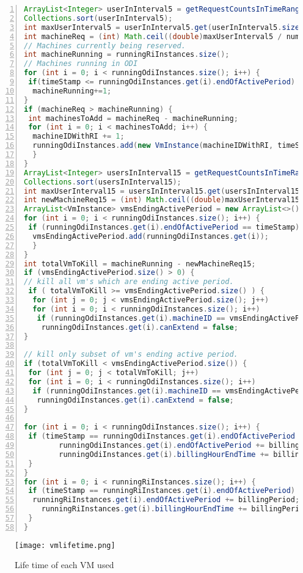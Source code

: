 \begin{lstlisting}[language=java,caption=AppElastic with RI and ODI instances,label=list:appelasticriodi,numbers=left,frame=single,fontadjust=true,breaklines,basicstyle=\small]
ArrayList<Integer> userInInterval5 = getRequestCountsInTimeRange(timeStamp, timeStamp + timeTakenToActive,false);
Collections.sort(userInInterval5);
int maxUserInterval5 = userInInterval5.get(userInInterval5.size() - 1);
int machineReq = (int) Math.ceil((double)maxUserInterval5 / numberOfUserPerInstance);
// Machines currently being reserved.
int machineRunning = runningRiInstances.size();
// Machines running in ODI
for (int i = 0; i < runningOdiInstances.size(); i++) {
 if(timeStamp <= runningOdiInstances.get(i).endOfActivePeriod)
  machineRunning+=1;
}
if (machineReq > machineRunning) {
 int machinesToAdd = machineReq - machineRunning;
 for (int i = 0; i < machinesToAdd; i++) {
  machineIDWithRI += 1;
  runningOdiInstances.add(new VmInstance(machineIDWithRI, timeStamp, timeStamp + billingPeriod, timeStamp + timeTakenToActive, (timeStamp + billingPeriod) - timetakenToShutdown));
  }
}
ArrayList<Integer> usersInInterval15 = getRequestCountsInTimeRange(timeStamp, timeStamp + scaleDownLookAhead,true);
Collections.sort(usersInInterval15);
int maxUserInterval15 = usersInInterval15.get(usersInInterval15.size() - 1);
int newMachineReq15 = (int) Math.ceil((double)maxUserInterval15 / numberOfUserPerInstance);
ArrayList<VmInstance> vmsEndingActivePeriod = new ArrayList<>();
for (int i = 0; i < runningOdiInstances.size(); i++) {
 if (runningOdiInstances.get(i).endOfActivePeriod == timeStamp) {
  vmsEndingActivePeriod.add(runningOdiInstances.get(i));
  }
}
int totalVmToKill = machineRunning - newMachineReq15;
if (vmsEndingActivePeriod.size() > 0) {
// kill all vm's which are ending active period.
 if ( totalVmToKill >= vmsEndingActivePeriod.size() ) {
  for (int j = 0; j < vmsEndingActivePeriod.size(); j++)
  for (int i = 0; i < runningOdiInstances.size(); i++)
   if (runningOdiInstances.get(i).machineID == vmsEndingActivePeriod.get(j).machineID)
  	runningOdiInstances.get(i).canExtend = false;
}

// kill only subset of vm's ending active period.
if (totalVmToKill < vmsEndingActivePeriod.size()) {
 for (int j = 0; j < totalVmToKill; j++)
 for (int i = 0; i < runningOdiInstances.size(); i++)
  if (runningOdiInstances.get(i).machineID == vmsEndingActivePeriod.get(j).machineID)
   runningOdiInstances.get(i).canExtend = false;
}

for (int i = 0; i < runningOdiInstances.size(); i++) {
 if (timeStamp == runningOdiInstances.get(i).endOfActivePeriod && runningOdiInstances.get(i).canExtend) {
  		runningOdiInstances.get(i).endOfActivePeriod += billingPeriod;
  		runningOdiInstances.get(i).billingHourEndTime += billingPeriod;
 }
}
for (int i = 0; i < runningRiInstances.size(); i++) {
 if (timeStamp == runningRiInstances.get(i).endOfActivePeriod) {
  runningRiInstances.get(i).endOfActivePeriod += billingPeriod;
	runningRiInstances.get(i).billingHourEndTime += billingPeriod;
 }
}
\end{lstlisting}

\begin{figure}[h]
  \begin{center}
    \texttt{[image: vmlifetime.png]}
    \caption{Life time of each VM used}
    \label{figure:vmlifetime}
  \end{center}
\end{figure}
